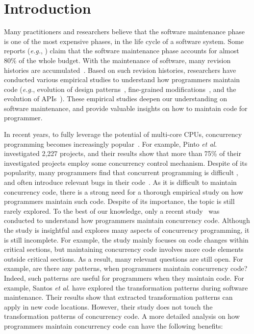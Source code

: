 \section{Introduction}
Many practitioners and researchers believe that the software maintenance phase is one of the most expensive phases, in the life cycle of a software system. Some reports (\emph{e.g.}, \cite{ahn2003software}) claim that the software maintenance phase accounts for almost 80\% of the whole budget. With the maintenance of software, many revision histories are accumulated~\cite{conf/icsm/Borges16}. Based on such revision histories, researchers have conducted various empirical studies to understand how programmers maintain code (\emph{e.g.}, evolution of design patterns~\cite{aversano2007empirical}, fine-grained modifications~\cite{german2006empirical}, and the evolution of APIs~\cite{mcdonnell2013empirical}). These empirical studies deepen our understanding on software maintenance, and provide valuable insights on how to maintain code for programmer.



In recent years, to fully leverage the potential of multi-core CPUs, concurrency programming becomes increasingly popular~\cite{journals/jss/PintoTFFB15}. For example, Pinto \textit{et al}. \cite{journals/jss/PintoTFFB15} investigated 2,227 projects, and their results show that more than 75\% of their investigated projects employ some concurrency control mechanism. Despite of its popularity, many programmers find that concurrent programming is difficult \cite{journals/corr/McKenney17}, and often introduce relevant bugs in their code~\cite{conf/asplos/LuPSZ08}. As it is difficult to maintain concurrency code, there is a strong need for a thorough empirical study on how programmers maintain such code. Despite of its importance, the topic is still rarely explored. To the best of our knowledge, only a recent study~\cite{conf/sigsoft/GuJSZL15} was conducted to understand how programmers maintain concurrency code. Although the study is insightful and explores many aspects of concurrency programming, it is still incomplete. For example, the study mainly focuses on code changes within critical sections, but maintaining concurrency code involves more code elements outside critical sections. As a result, many relevant questions are still open. For example, are there any patterns, when programmers maintain concurrency code? Indeed, such patterns are useful for programmers when they maintain code. For example, Santos \textit{et al}. \cite{conf/icsm/SantosAEDV15} have explored the transformation patterns during software maintenance. Their results show that extracted transformation patterns can apply in new code locations. However, their study does not touch the transformation patterns of concurrency code. A more detailed analysis on how programmers maintain concurrency code can have the following benefits:




